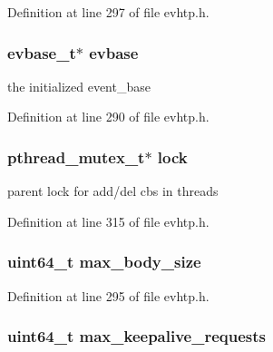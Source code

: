 Definition at line 297 of file evhtp.\-h.

\hypertarget{structevhtp__s_abc4ce26b166a97e5766105f253a4fe21}{
\subsubsection[{evbase}]{\setlength{\rightskip}{0pt plus 5cm}evbase\-\_\-t$\ast$ evbase}}\label{structevhtp__s_abc4ce26b166a97e5766105f253a4fe21}
the initialized event\-\_\-base 

Definition at line 290 of file evhtp.\-h.

\hypertarget{structevhtp__s_a33586b4184d23f2b8f4df153ec23af13}{
\subsubsection[{lock}]{\setlength{\rightskip}{0pt plus 5cm}pthread\-\_\-mutex\-\_\-t$\ast$ lock}}\label{structevhtp__s_a33586b4184d23f2b8f4df153ec23af13}
parent lock for add/del cbs in threads 

Definition at line 315 of file evhtp.\-h.

\hypertarget{structevhtp__s_ac0c51866465cd3ccc68751b0ce806cbc}{
\subsubsection[{max\-\_\-body\-\_\-size}]{\setlength{\rightskip}{0pt plus 5cm}uint64\-\_\-t max\-\_\-body\-\_\-size}}\label{structevhtp__s_ac0c51866465cd3ccc68751b0ce806cbc}


Definition at line 295 of file evhtp.\-h.

\hypertarget{structevhtp__s_a79992dc6217af1d8e8801040ca6ef21e}{
\subsubsection[{max\-\_\-keepalive\-\_\-requests}]{\setlength{\rightskip}{0pt plus 5cm}uint64\-\_\-t max\-\_\-keepalive\-\_\-requests}}\label{structevhtp__s_a79992dc6217af1d8e8801040ca6ef21e}


